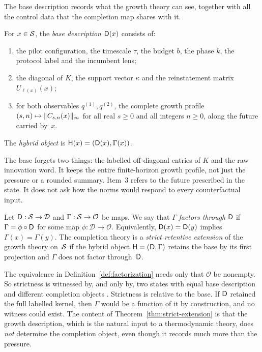 The base description records what the growth theory can see, together with all the control data that the completion map shares with it.

\begin{definition}\label{def:base}
For $x\in\mathcal{S}$, the \emph{base description} $\mathsf{D}(x)$ consists of:
\begin{enumerate}
  \item the pilot configuration, the timescale $\tau$, the budget $b$, the phase $k$, the protocol label and the incumbent lens;
  \item the diagonal of $K$, the support vector $\kappa$ and the reinstatement matrix $U_{\ell(x)}(x)$;
  \item for both observables $q^{(1)},q^{(2)}$, the complete growth profile $(s,n)\mapsto\lVert C_{s,n}(x)\rVert_{\infty}$ for all real $s\ge0$ and all integers $n\ge0$, along the future carried by~$x$.
\end{enumerate}
The \emph{hybrid object} is $\mathsf{H}(x)=(\mathsf{D}(x),\Gamma(x))$.
\end{definition}

The base forgets two things: the labelled off-diagonal entries of $K$ and the raw innovation word. It keeps the entire finite-horizon growth profile, not just the pressure or a rounded summary. Item~3 refers to the future prescribed in the state. It does not ask how the norms would respond to every counterfactual input.

\begin{definition}\label{def:factorization}
Let $\mathsf{D}:\mathcal{S}\to\mathcal{D}$ and $\Gamma:\mathcal{S}\to\mathcal{O}$ be maps. We say that $\Gamma$ \emph{factors through} $\mathsf{D}$ if $\Gamma=\phi\circ\mathsf{D}$ for some map $\phi:\mathcal{D}\to\mathcal{O}$. Equivalently, $\mathsf{D}(x)=\mathsf{D}(y)$ implies $\Gamma(x)=\Gamma(y)$. The completion theory is a \emph{strict retentive extension} of the growth theory on~$\mathcal{S}$ if the hybrid object $\mathsf{H}=(\mathsf{D},\Gamma)$ retains the base by its first projection and $\Gamma$ does not factor through~$\mathsf{D}$.
\end{definition}

The equivalence in Definition~\ref{def:factorization} needs only that $\mathcal{O}$ be nonempty. So strictness is witnessed by, and only by, two states with equal base description and different completion objects \cite{TsiokosFoundations}. Strictness is relative to the base. If $\mathsf{D}$ retained the full labelled kernel, then $\Gamma$ would be a function of it by construction, and no witness could exist. The content of Theorem~\ref{thm:strict-extension} is that the growth description, which is the natural input to a thermodynamic theory, does \emph{not} determine the completion object, even though it records much more than the pressure.
